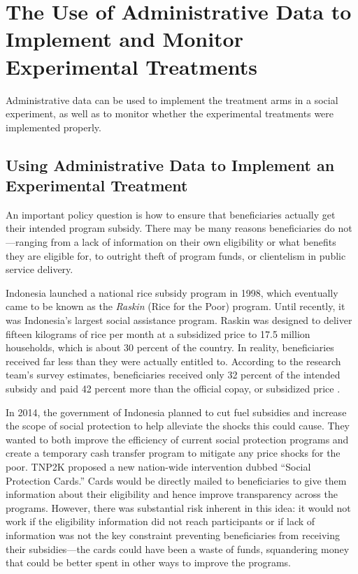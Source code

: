 \hypertarget{the-use-of-administrative-data-to-implement-and-monitor-experimental-treatments}{%
\section{The Use of Administrative Data to Implement and Monitor Experimental Treatments}\label{the-use-of-administrative-data-to-implement-and-monitor-experimental-treatments}}

Administrative data can be used to implement the treatment arms in a social experiment, as well as to monitor whether the experimental treatments were implemented properly.

\hypertarget{using-administrative-data-to-implement-an-experimental-treatment}{%
\subsection{Using Administrative Data to Implement an Experimental Treatment}\label{using-administrative-data-to-implement-an-experimental-treatment}}

An important policy question is how to ensure that beneficiaries actually get their intended program subsidy. There may be many reasons beneficiaries do not---ranging from a lack of information on their own eligibility or what benefits they are eligible for, to outright theft of program funds, or clientelism in public service delivery.

Indonesia launched a national rice subsidy program in 1998, which eventually came to be known as the \emph{Raskin} (Rice for the Poor) program. Until recently, it was Indonesia's largest social assistance program. Raskin was designed to deliver fifteen kilograms of rice per month at a subsidized price to 17.5 million households, which is about 30 percent of the country. In reality, beneficiaries received far less than they were actually entitled to. According to the research team's survey estimates, beneficiaries received only 32 percent of the intended subsidy and paid 42 percent more than the official copay, or subsidized price \citep{banerjee2018}.

In 2014, the government of Indonesia planned to cut fuel subsidies and increase the scope of social protection to help alleviate the shocks this could cause. They wanted to both improve the efficiency of current social protection programs and create a temporary cash transfer program to mitigate any price shocks for the poor. TNP2K proposed a new nation-wide intervention dubbed ``Social Protection Cards.'' Cards would be directly mailed to beneficiaries to give them information about their eligibility and hence improve transparency across the programs. However, there was substantial risk inherent in this idea: it would not work if the eligibility information did not reach participants or if lack of information was not the key constraint preventing beneficiaries from receiving their subsidies---the cards could have been a waste of funds, squandering money that could be better spent in other ways to improve the programs.

